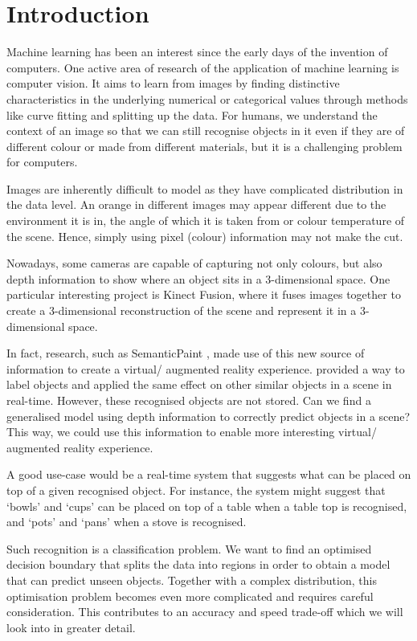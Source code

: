 \chapter{Introduction} \label{chap:introduction}
Machine learning has been an interest since the early days of the invention of computers. One active area of research of the application of machine learning is computer vision. It aims to learn from images by finding distinctive characteristics in the underlying numerical or categorical values through methods like curve fitting and splitting up the data.  For humans, we understand the context of an image so that we can still recognise objects in it even if they are of different colour or made from different materials, but it is a challenging problem for computers. 

Images are inherently difficult to model as they have complicated distribution in the data level. An orange in different images may appear different due to the environment it is in, the angle of which it is taken from or colour temperature of the scene. Hence, simply using pixel (colour) information may not make the cut.

Nowadays, some cameras are capable of capturing not only colours, but also depth information to show where an object sits in a 3-dimensional space. One particular interesting project is Kinect Fusion, where it fuses images together to create a 3-dimensional reconstruction of the scene and represent it in a 3-dimensional space.

In fact, research, such as SemanticPaint \cite{semantic-paint}, made use of this new source of information to create a virtual/ augmented reality experience.  provided a way to label objects and applied the same effect on other similar objects in a scene in real-time. However, these recognised objects are not stored. Can we find a generalised model using depth information to correctly predict objects in a scene? This way, we could use this information to enable more interesting virtual/ augmented reality experience. 

A good use-case would be a real-time system that suggests what can be placed on top of a given recognised object. For instance, the system might suggest that `bowls' and `cups' can be placed on top of a table when a table top is recognised, and `pots' and `pans' when a stove is recognised. 

Such recognition is a classification problem. We want to find an optimised decision boundary that splits the data into regions in order to obtain a model that can predict unseen objects. Together with a complex distribution, this optimisation problem becomes even more complicated and requires careful consideration. This contributes to an accuracy and speed trade-off which we will look into in greater detail.


